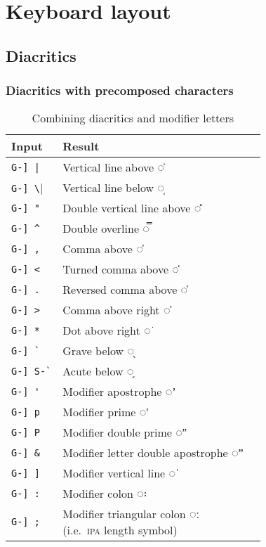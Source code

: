 \documentclass[oneside]{memoir}
\newcommand{\key}{\verb}
\begin{document}
{{\chapter{Keyboard layout}
\label{sec:keyboard_layout}

\section{Diacritics}
\label{sec:diacritics}

\subsection{Diacritics with precomposed characters}
\label{sec:diacritics_with_precomposed_characters}

\begin{wraptable}[31]{r}{5cm}
\centering
\cprotect\caption{Combining diacritics and modifier letters}
\label{tab:misc_diacritics_mappings}
\begin{tabular}{ll}
\toprule
Input & Result \\
\midrule
\key!G-] |!   & Vertical line above ◌̍ \\
\key|G-] \|   & Vertical line below ◌̩ \\
\key|G-] "|   & Double vertical line above ◌̎ \\
\key|G-] ^|   & Double overline ◌̿ \\
\key|G-] ,|   & Comma above ◌̓ \\
\key|G-] <|   & Turned comma above ◌̒ \\
\key|G-] .|   & Reversed comma above  ◌̔ \\
\key|G-] >|   & Comma above right ◌̕ \\
\key|G-] *|   & Dot above right ◌͘ \\
\key|G-] `|   & Grave below ◌̖ \\
\key|G-] S-`| & Acute below ◌̗ \\
\midrule
\key|G-] '|   & Modifier apostrophe ◌ʼ \\
\key|G-] p|   & Modifier prime ◌ʹ \\
\key|G-] P|   & Modifier double prime ◌ʺ \\
\key|G-] &|   & Modifier letter double apostrophe ◌ˮ \\
\key|G-] ]|   & Modifier vertical line ◌ˈ \\
\key|G-] :|   & Modifier colon ◌꞉ \\
\key|G-] ;|   & \makecell{Modifier triangular colon ◌ː\\(i.e.\ \textsc{ipa} length symbol)} \\

\end{tabular}
\end{wraptable}}}
\end{document}
